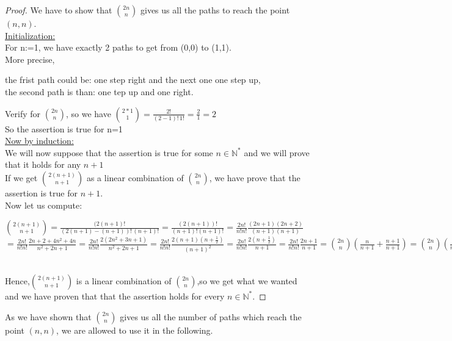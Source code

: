 \documentclass[a4paper,12pt,oneside]{article}
\begin{document}
\begin{proof}
We have to show that $\binom{2n}{n}$ gives us all the paths to reach the point $(n,n)$.\vspace{0.3cm}\\
\underline{Initialization:}
\\ For n:=1, we have exactly 2 paths to get from (0,0)  to (1,1).
\\ More precise, 
\begin{center}
the frist path could be: one step right and the next one one step up, 
\\the second path is than: one tep up and one right.
\end{center}
\vspace{0.3cm}
Verify for  $\binom{2n}{n}$, so we have  $\binom{2*1}{1}=\frac{2!}{(2-1)!\,1!}=\frac{2}{1}=2$\
\vspace{0.3cm} \\ So the assertion is true for n=1
\vspace{0.2cm}\\
\underline{Now by induction:}
\vspace {0.1cm}\\ We will now suppose that the assertion is true for some $n\in\mathbb{N^*}$ and we will prove that it holds for any $n+1$ \\If we get $\binom{2(n+1)}{n+1}$ as a linear combination of $\binom{2n}{n}$, we have prove that the assertion is true for $n+1$.\vspace{0.3cm}\\
Now let us compute:\vspace{0.2cm}\\
\begin{center}
 $\binom{2(n+1)}{n+1}=\frac{(2(n+1)!}{(2(n+1)-(n+1))!\,(n+1)!}
=\frac{(2(n+1))!}{(n+1)!(n+1)!}=\frac{2n!}{n!n!}\frac{(2n+1)(2n+2)}{(n+1)(n+1)}$\\$=\frac{2n!}{n!n!}\frac{2n+2+4n^2+4n}{n^2+2n+1}=\frac{2n!}{n!n!}\frac{2(2n^2+3n+1)}{n^2+2n+1}=\frac{2n!}{n!n!}\frac{2(n+1)(n+\frac{1}{2})}{(n+1)^2}=\frac{2n!}{n!n!}\frac{2(n+\frac{1}{2})}{n+1}=\frac{2n!}{n!n!}\frac{2n+1}{n+1}=\binom{2n}{n}(\frac{n}{n+1}+\frac{n+1}{n+1})=\binom{2n}{n}(\frac{n}{n+1}+1)=\frac{n}{n+1}\binom{2n}{n}+\binom{2n}{n}$\
\end{center}
\vspace{0.3cm}
Hence,$\binom{2(n+1)}{n+1}$ is a linear combination of $\binom{2n}{n}$,so we get what we wanted and we have proven that that the assertion holds for every $n\in\mathbb{N^*}$.
\end{proof}
\vspace{0.3cm}As we have shown that $\binom{2n}{n}$ gives us all the number of paths which reach the point $(n,n)$, we are allowed to use it in the following.
\end{document}
